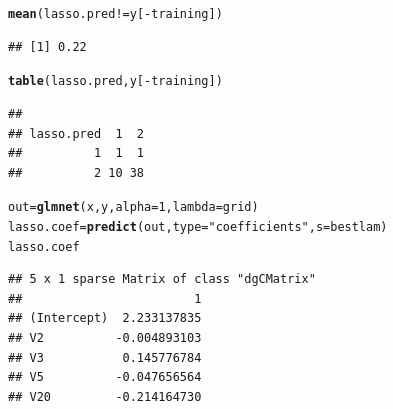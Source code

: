 \documentclass{article}\usepackage[]{graphicx}\usepackage[]{color}
\makeatletter
\newcommand{\hlnum}[1]{\textcolor[rgb]{0.686,0.059,0.569}{#1}}%
\newcommand{\hlstr}[1]{\textcolor[rgb]{0.192,0.494,0.8}{#1}}%
\newcommand{\hlopt}[1]{\textcolor[rgb]{0,0,0}{#1}}%
\newcommand{\hlstd}[1]{\textcolor[rgb]{0.345,0.345,0.345}{#1}}%
\newcommand{\hlkwb}[1]{\textcolor[rgb]{0.69,0.353,0.396}{#1}}%
\newcommand{\hlkwc}[1]{\textcolor[rgb]{0.333,0.667,0.333}{#1}}%
\newcommand{\hlkwd}[1]{\textcolor[rgb]{0.737,0.353,0.396}{\textbf{#1}}}%
\newenvironment{kframe}{%
 \def\at@end@of@kframe{}%
 \ifinner\ifhmode%
  \def\at@end@of@kframe{\end{minipage}}%
  \begin{minipage}{\columnwidth}%
 \fi\fi%
 \def\FrameCommand##1{\hskip\@totalleftmargin \hskip-\fboxsep
 \colorbox{shadecolor}{##1}\hskip-\fboxsep
     \hskip-\linewidth \hskip-\@totalleftmargin \hskip\columnwidth}%
 \MakeFramed {\advance\hsize-\width
   \@totalleftmargin\z@ \linewidth\hsize
   \@setminipage}}%
 {\par\unskip\endMakeFramed%
 \at@end@of@kframe}
\newenvironment{knitrout}{}{} %
\makeatother
\begin{document}
\begin{knitrout}
\begin{kframe}
\begin{alltt}
\hlkwd{mean}\hlstd{(lasso.pred} \hlopt{!=} \hlstd{y[}\hlopt{-}\hlstd{training])}
\end{alltt}
\begin{verbatim}
## [1] 0.22
\end{verbatim}
\begin{alltt}
\hlkwd{table}\hlstd{(lasso.pred, y[}\hlopt{-}\hlstd{training])}
\end{alltt}
\begin{verbatim}
##           
## lasso.pred  1  2
##          1  1  1
##          2 10 38
\end{verbatim}
\begin{alltt}
\hlstd{out}\hlkwb{=}\hlkwd{glmnet}\hlstd{(x,y,}\hlkwc{alpha}\hlstd{=}\hlnum{1}\hlstd{,}\hlkwc{lambda}\hlstd{=grid)}
\hlstd{lasso.coef}\hlkwb{=}\hlkwd{predict}\hlstd{(out,}\hlkwc{type}\hlstd{=}\hlstr{"coefficients"}\hlstd{,}\hlkwc{s}\hlstd{=bestlam)}
\hlstd{lasso.coef}
\end{alltt}
\begin{verbatim}
## 5 x 1 sparse Matrix of class "dgCMatrix"
##                        1
## (Intercept)  2.233137835
## V2          -0.004893103
## V3           0.145776784
## V5          -0.047656564
## V20         -0.214164730
\end{verbatim}
\end{kframe}
\end{knitrout}
\end{document}
